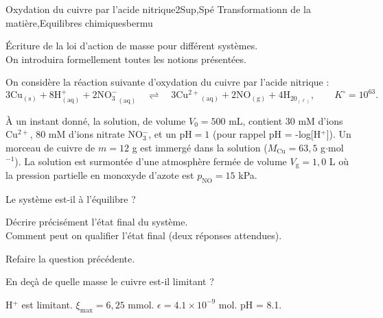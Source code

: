 \begin{exercise}{Oxydation du cuivre par l'acide nitrique}{2}{Sup,Spé}
{Transformationn de la matière,Equilibres chimiques}{bermu}

\begin{questions}
\questioncours \'Ecriture de la loi d'action de masse pour différent systèmes. \\
On introduira formellement toutes les notions présentées.

\begin{EnvUplevel}
 On considère la réaction suivante d'oxydation du cuivre par l'acide nitrique :
 $$\mathrm{3 Cu_{(s)} + 8 H^+_{(aq)} + 2 {NO_3^-}_{(aq)} \quad\rightleftharpoons\quad 3 {Cu^{2+}}_{(aq)} + 2 NO_{(g)} + 4 H_20_{(\ell)}}, \qquad K^\circ = 10^{63}.$$
 
 À un instant donné, la solution, de volume $V_0 = 500$ mL, contient 30 mM d’ions Cu$^{2+}$, 80 mM d'ions nitrate NO$_3^-$, et un pH$ = 1$ (pour rappel pH = -log[H$^+$]). Un morceau de cuivre de $m = 12$ g est immergé dans  la solution ($M_\text{Cu} = 63,5$ g$\cdot$mol$^{-1}$). La solution est surmontée d’une atmosphère fermée de volume $V_\text{g} = 1,0$ L où la pression partielle en monoxyde d’azote est $p_\text{NO} = 15$ kPa.
\end{EnvUplevel}

    \question Le système est-il à l'équilibre ?
 
    \question Décrire précisément l’état final du système. \\
 Comment peut on qualifier l'état final (deux réponses attendues).
 
 
    \question Refaire la question précédente.
 
    \question En deçà de quelle masse le cuivre est-il limitant ?
 
 
 

\end{questions}


\end{exercise}

\begin{solution}

H$^+$ est limitant. $\xi_\text{max} = 6,25$ mmol. $\epsilon = 4.1\times 10^{-9}$ mol. pH = 8.1.

\end{solution}